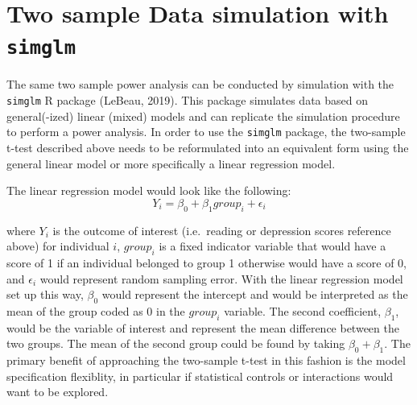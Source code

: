 \documentclass[man,mask,floatsintext]{apa6}
\begin{document}
\hypertarget{two-sample-data-simulation-with-simglm}{%
\section{\texorpdfstring{Two sample Data simulation with \texttt{simglm}}{Two sample Data simulation with simglm}}\label{two-sample-data-simulation-with-simglm}}

The same two sample power analysis can be conducted by simulation with the \texttt{simglm} R package (LeBeau, 2019). This package simulates data based on general(-ized) linear (mixed) models and can replicate the simulation procedure to perform a power analysis. In order to use the \texttt{simglm} package, the two-sample t-test described above needs to be reformulated into an equivalent form using the general linear model or more specifically a linear regression model.

The linear regression model would look like the following:
\begin{equation} 
Y_{i} = \beta_{0} + \beta_{1} group_{i} + \epsilon_{i} 
\label{eq:twosamp}
\end{equation}

\noindent where \(Y_{i}\) is the outcome of interest (i.e.~reading or depression scores reference above) for individual \(i\), \(group_{i}\) is a fixed indicator variable that would have a score of 1 if an individual belonged to group 1 otherwise would have a score of 0, and \(\epsilon_{i}\) would represent random sampling error. With the linear regression model set up this way, \(\beta_{0}\) would represent the intercept and would be interpreted as the mean of the group coded as 0 in the \(group_{i}\) variable. The second coefficient, \(\beta_{1}\), would be the variable of interest and represent the mean difference between the two groups. The mean of the second group could be found by taking \(\beta_{0} + \beta_{1}\). The primary benefit of approaching the two-sample t-test in this fashion is the model specification flexiblity, in particular if statistical controls or interactions would want to be explored.
\end{document}
